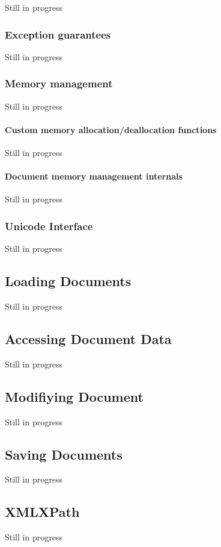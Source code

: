 Still in progress \hypertarget{XMLManual_XMLExceptionSafety}{}\subsubsection{Exception guarantees}\label{XMLManual_XMLExceptionSafety}
Still in progress \hypertarget{XMLManual_XMLMemory}{}\subsubsection{Memory management}\label{XMLManual_XMLMemory}
Still in progress \hypertarget{XMLManual_XMLCustomAlloc}{}\paragraph{Custom memory allocation/deallocation functions}\label{XMLManual_XMLCustomAlloc}
Still in progress \hypertarget{XMLManual_XMLMemoryInternals}{}\paragraph{Document memory management internals}\label{XMLManual_XMLMemoryInternals}
Still in progress \hypertarget{XMLManual_XMLUnicode}{}\subsubsection{Unicode Interface}\label{XMLManual_XMLUnicode}
Still in progress \hypertarget{XMLManual_XMLLoading}{}\subsection{Loading Documents}\label{XMLManual_XMLLoading}
Still in progress \hypertarget{XMLManual_XMLAccessing}{}\subsection{Accessing Document Data}\label{XMLManual_XMLAccessing}
Still in progress \hypertarget{XMLManual_XMLModifying}{}\subsection{Modifiying Document}\label{XMLManual_XMLModifying}
Still in progress \hypertarget{XMLManual_XMLSaving}{}\subsection{Saving Documents}\label{XMLManual_XMLSaving}
Still in progress \hypertarget{XMLManual_XMLXPath}{}\subsection{XMLXPath}\label{XMLManual_XMLXPath}
Still in progress 